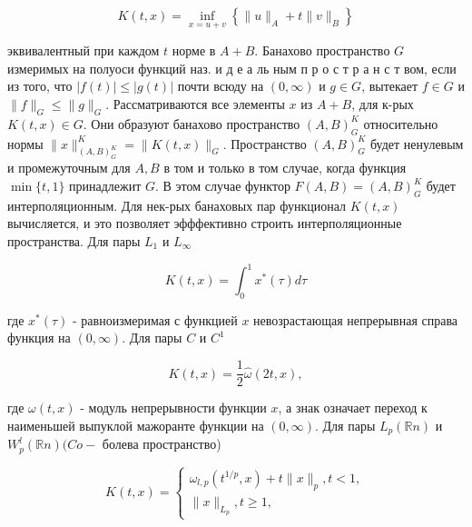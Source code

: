 \documentclass[10pt]{article}
\begin{document}
\[

K(t, x)=\inf _{x=u+v}\left\{\|u\|_{A}+t\|v\|_{B}\right\}

\]



эквивалентный при каждом $t$ норме в $A+B$. Банахово пространство $G$ измеримых на полуоси функций наз. и д е а ль ным п р о с т р а н с т вом, если из того, что $|f(t)| \leqslant|g(t)|$ почти всюду на $(0, \infty)$ и $g \in G$, вытекает $f \in G$ и $\|f\|_{G} \leqslant\|g\|_{G}$. Рассматриваются все элементы $x$ из $A+B$, для к-рых $K(t, x) \in G$. Они образуют банахово пространство $(A, B)_{G}^{K}$ относительно нормы $\|x\|_{(A, B)_{G}^{K}}^{K}=\|K(t, x)\|_{G}$. Пространство $(A, B)_{G}^{K}$ будет ненулевым и промежуточным для $A, B$ в том и только в том случае, когда функция $\min \{t, 1\}$ принадлежит $G$. В этом случае функтор $F(A, B)=(A, B)_{G}^{K}$ будет интерполяционным. Для нек-рых банаховых пар функционал $K(t, x)$ вычисляется, и это позволяет эфффективно строить интерполяционные пространства. Для пары $L_{1}$ и $L_{\infty}$



\[

K(t, x)=\int_{0}^{1} x^{*}(\tau) d \tau

\]



где $x^{*}(\tau)$ - равноизмеримая с функцией $x$ невозрастающая непрерывная справа функция на $(0, \infty)$. Для пары $C$ и $C^{1}$



\[

K(t, x)=\frac{1}{2} \widehat{\omega}(2 t, x),

\]



где $\omega(t, x)$ - модуль непрерывности функции $x$, а знак означает переход к наименьшей выпуклой мажоранте функции на $(0, \infty)$. Для пары $L_{p}(\mathbb{R} n)$ и $W_{p}^{l}(\mathbb{R} n)(C o-$ болева пространство)



\[

K(t, x)=\left\{\begin{array}{l}

\omega_{l, p}\left(t^{1 / p}, x\right)+t\|x\|_{p}, t<1, \\

\|x\|_{L_{p}}, t \geqslant 1,

\end{array}\right.

\]
\end{document}

